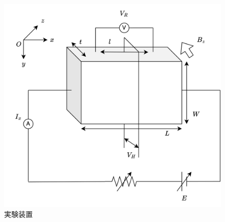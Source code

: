 \begin{figure}
	\centering
	\includegraphics[width=0.8\linewidth]{src/figures/exp/exp.png}
	\caption{実験装置}\label{fig:exp}
\end{figure}
